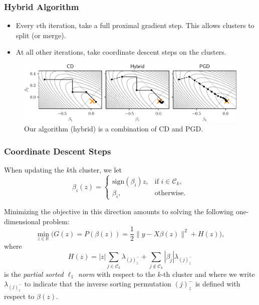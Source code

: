 \begin{frame}[c]
  \frametitle{Hybrid Algorithm}

  \begin{itemize}
    \item Every \(v\)th iteration, take a full proximal gradient step.
          This allows clusters to split (or merge).
    \item At all other iterations, take coordinate descent steps on the clusters.
  \end{itemize}

  \pause

  \begin{figure}[htpb]
    \centering
    \includegraphics[width=\textwidth]{figures/illustration_solvers.pdf}
    \caption{%
      Our algorithm (hybrid) is a combination of CD and PGD.
    }
    \label{fig:illustration}
  \end{figure}

\end{frame}

\begin{frame}
  \frametitle{Coordinate Descent Steps}

  When updating the \(k\)th cluster, we let
  \begin{equation*}
    \beta_i(z) =
    \begin{cases}
      \mathrm{sign}(\beta_i) z   , & \text{if } i \in \mathcal{C}_k, \\
      \beta_i,                     & \text{otherwise}.
    \end{cases}
  \end{equation*}

  \pause

  Minimizing the objective in this direction amounts to solving the following
  one-dimensional problem:
  \[
    \min_{z \in \mathbb{R}} \Big(
    G(z) = P(\beta(z))  = \frac{1}{2} \lVert y - X \beta(z)\rVert^2 + H(z)
    \Big),
  \]
  where
  \begin{equation*}
    H(z) = |z| \sum_{j \in \mathcal{C}_k} \lambda_{(j)^-_z}
    + \sum_{j \notin \mathcal{C}_k} |\beta_j| \lambda_{(j)^-_z}
  \end{equation*}
  is the \emph{partial sorted \(\ell_1\) norm} with respect to the \(k\)-th cluster and where we write \(\lambda_{(j)^-_z}\) to indicate that the inverse sorting permutation \((j)^-_z\)
  is defined with respect to \(\beta(z)\).
\end{frame}

